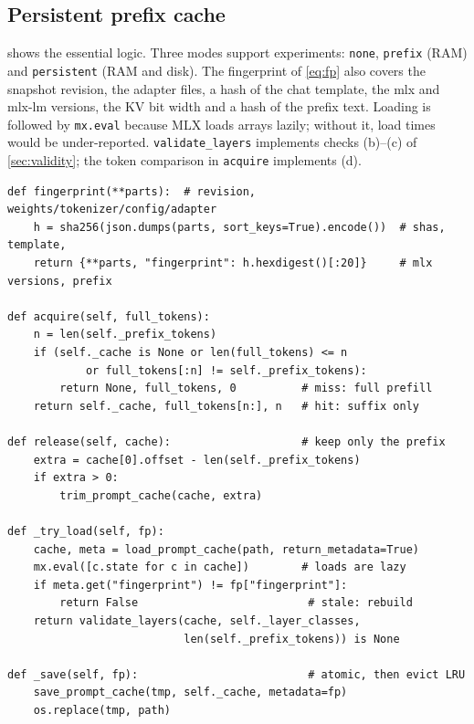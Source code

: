 \documentclass[10pt,twocolumn,letterpaper]{article}
\theoremstyle{definition}
\begin{document}
\subsection{Persistent prefix cache}
 shows the essential logic. Three modes support experiments: \texttt{none},
\texttt{prefix} (RAM) and \texttt{persistent} (RAM and disk). The fingerprint of \cref{eq:fp} also
covers the snapshot revision, the adapter files, a hash of the chat template, the mlx and mlx-lm
versions, the KV bit width and a hash of the prefix text. Loading is followed by \texttt{mx.eval}
because MLX loads arrays lazily; without it, load times would be under-reported.
\texttt{validate\_layers} implements checks (b)--(c) of \cref{sec:validity}; the token comparison in
\texttt{acquire} implements (d).

\begin{lstlisting}[caption={Acquire, release and fingerprinted persistence (abridged from \texttt{models/kv\_cache.py}).},label={lst:kv},float=t]
def fingerprint(**parts):  # revision, weights/tokenizer/config/adapter
    h = sha256(json.dumps(parts, sort_keys=True).encode())  # shas, template,
    return {**parts, "fingerprint": h.hexdigest()[:20]}     # mlx versions, prefix

def acquire(self, full_tokens):
    n = len(self._prefix_tokens)
    if (self._cache is None or len(full_tokens) <= n
            or full_tokens[:n] != self._prefix_tokens):
        return None, full_tokens, 0          # miss: full prefill
    return self._cache, full_tokens[n:], n   # hit: suffix only

def release(self, cache):                    # keep only the prefix
    extra = cache[0].offset - len(self._prefix_tokens)
    if extra > 0:
        trim_prompt_cache(cache, extra)

def _try_load(self, fp):
    cache, meta = load_prompt_cache(path, return_metadata=True)
    mx.eval([c.state for c in cache])        # loads are lazy
    if meta.get("fingerprint") != fp["fingerprint"]:
        return False                          # stale: rebuild
    return validate_layers(cache, self._layer_classes,
                           len(self._prefix_tokens)) is None

def _save(self, fp):                          # atomic, then evict LRU
    save_prompt_cache(tmp, self._cache, metadata=fp)
    os.replace(tmp, path)
\end{lstlisting}
\end{document}
